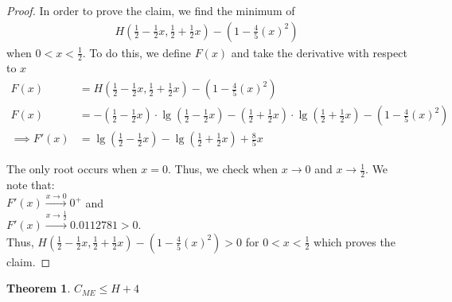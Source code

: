 \documentclass[letterpaper,12pt,titlepage,oneside,final]{book}
\theoremstyle{plain}
\newtheorem{thm}{Theorem}[section]
\begin{document}
\begin{proof}
In order to prove the claim, we find the minimum of
\begin{align*}
H(\frac{1}{2}-\frac{1}{2} x, \frac{1}{2} + \frac{1}{2} x) - (1 - \frac{4}{5} (x)^2) 
\end{align*}
when $0 < x < \frac{1}{2}$. To do this, we define $F(x)$ and take the derivative with respect to $x$
\begin{align*}
F(x) &= H(\frac{1}{2}-\frac{1}{2} x, \frac{1}{2} + \frac{1}{2} x) - (1 - \frac{4}{5} (x)^2) \\
F(x) &= - (\frac{1}{2}-\frac{1}{2} x)\cdot \lg(\frac{1}{2}-\frac{1}{2} x) - (\frac{1}{2} + \frac{1}{2} x)\cdot\lg(\frac{1}{2} + \frac{1}{2} x) - (1 - \frac{4}{5} (x)^2) \\
\implies F'(x) &= \lg(\frac{1}{2}-\frac{1}{2} x) - \lg(\frac{1}{2} + \frac{1}{2} x) + \frac{8}{5}x
\end{align*}

The only root occurs when $x = 0$. Thus, we check when $x \rightarrow 0$ and $x \rightarrow \frac{1}{2}$. We note that: \\
$F'(x) \xrightarrow{x \to 0} 0^{+}$ and \\
$F'(x) \xrightarrow{x \to \frac{1}{2}} 0.0112781 > 0$. \\
Thus, $H(\frac{1}{2}-\frac{1}{2} x, \frac{1}{2} + \frac{1}{2} x) - (1 - \frac{4}{5} (x)^2) > 0$ for $ 0 < x < \frac{1}{2}$ which proves the claim.
\end{proof} 


\begin{thm}
$C_{ME} \leq H + 4$
\end{thm}
\end{document}
